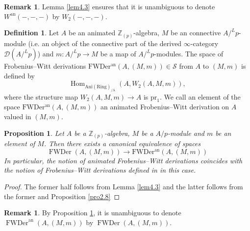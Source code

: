 \documentclass[11pt, a4paper]{amsart}
\theoremstyle{plain}
\newtheorem{prop}[theorem]{Proposition}
\theoremstyle{definition}
\newtheorem{definition}[theorem]{Definition}
\newtheorem{remark}[theorem]{Remark}
\begin{document}
\begin{remark}\label{rem4.4}
    Lemma \ref{lem4.3} ensures that it is unambiguous to denote $W^{\mathrm{an}}(-,-,-)$ by $W_2(-,-,-)$.
\end{remark}



\begin{definition}\label{def4.5}
    Let $A$ be an animated $\mathbb Z_{(p)}$-algebra, $M$ be an connective $A/^Lp$-module (i.e. an object of the connective part of the derived $\infty$-category $\mathcal D(A/^Lp)$) and $m:A/^Lp\to M$ be a map of $A/^Lp$-modules. The space of Frobenius--Witt derivations $\operatorname{FWDer^{an}}(A,(M,m))\in \mathcal S$ from $A$ to $(M,m)$ is defined by \[\operatorname{Hom}_{\operatorname{Ani(Ring)_{/A}}}(A,W_2(A,M,m)),\] where the structure map $W_2(A,M,m)\to A$ is $\mathrm{pr}_1$. We call an element of the space $\operatorname{FWDer^{an}}(A,(M,m))$ an animated Frobenius--Witt derivation on $A$ valued in $(M,m)$.
\end{definition}
\begin{prop}\label{pro4.6}
    Let $A$ be a $\mathbb Z_{(p)}$-algebra, $M$ be a $A/p$-module and $m$ be an element of $M$. Then there exists a canonical equivalence of spaces\[\operatorname{FWDer}(A,(M,m))\to \operatorname{FWDer^{an}}(A,(M,m))\] In particular, the notion of animated Frobenius--Witt derivations coincides with the notion of Frobenius--Witt derivations defined in \cite{Sai22} in this case.
\end{prop}
\begin{proof}
    The former half follows from Lemma \ref{lem4.3} and the latter follows from the former and Proposition \ref{pro2.8}
\end{proof}
\begin{remark}
    By Proposition \ref{pro4.6}, it is unambiguous to denote $\operatorname{FWDer}^{\mathrm{an}}(A,(M,m))$ by $\operatorname{FWDer}(A,(M,m))$.
\end{remark}
\end{document}
